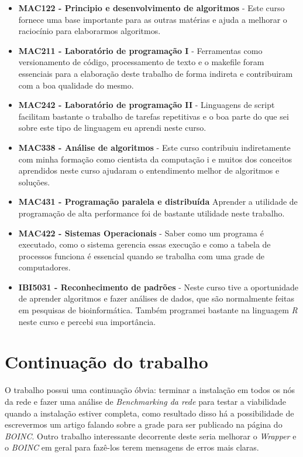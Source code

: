 \begin{itemize}
  \item \textbf{MAC122 - Principio e desenvolvimento de algoritmos } - Este curso fornece uma base importante para as outras matérias e
ajuda a melhorar o raciocínio para elaborarmos algoritmos.
  \item \textbf{MAC211 - Laboratório de programação I} - Ferramentas como versionamento de código, processamento de 
texto e o makefile foram essenciais para a elaboração deste trabalho de forma indireta e contribuiram com a 
boa qualidade do mesmo.
  \item \textbf{MAC242 - Laboratório de programação II} - Linguagens de script facilitam bastante o trabalho de tarefas 
repetitivas e o boa parte do que sei sobre este tipo de linguagem eu aprendi neste curso.
  \item \textbf{MAC338 - Análise de algoritmos} - Este curso contribuiu indiretamente com minha formação como cientista da computação i
e muitos dos conceitos aprendidos neste curso ajudaram o entendimento melhor de algoritmos e soluções.
  \item \textbf{MAC431 - Programação paralela e distribuída} Aprender a utilidade de programação de alta performance foi de bastante utilidade
neste trabalho.
  \item \textbf{MAC422 - Sistemas Operacionais} - Saber como um programa é executado, como o sistema gerencia essas execução e como a tabela de processos
funciona é essencial quando se trabalha com uma grade de computadores. 
  \item \textbf{IBI5031 - Reconhecimento de padrões} - Neste curso tive a oportunidade de aprender algoritmos e fazer análises de dados, 
que são normalmente feitas em pesquisas de bioinformática. Também programei bastante na linguagem \emph{R} neste curso e percebi sua
importância.
\end{itemize}

\section{Continuação do trabalho}

O trabalho possui uma continuação óbvia: terminar a instalação em todos os nós da rede e fazer uma análise de \emph{Benchmarking da rede} para
testar a viabilidade quando a instalação estiver completa, como resultado disso há a possibilidade de
escrevermos um artigo falando sobre a grade para ser publicado na página do \emph{BOINC}. Outro trabalho interessante decorrente deste 
seria melhorar o \emph{Wrapper} e o \emph{BOINC} em geral para fazê-los terem mensagens de erros mais claras. 

